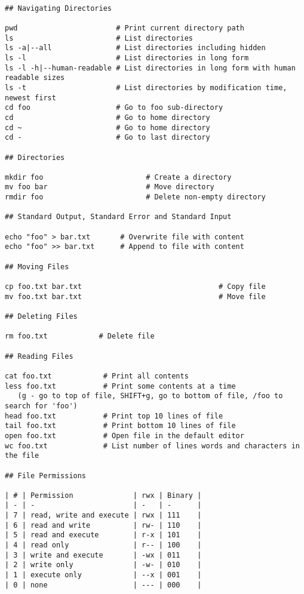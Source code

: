 \documentclass[12pt]{article}
\begin{document}
\begin{verbatim}

## Navigating Directories

pwd                       # Print current directory path
ls                        # List directories
ls -a|--all               # List directories including hidden
ls -l                     # List directories in long form
ls -l -h|--human-readable # List directories in long form with human readable sizes
ls -t                     # List directories by modification time, newest first
cd foo                    # Go to foo sub-directory
cd                        # Go to home directory
cd ~                      # Go to home directory
cd -                      # Go to last directory

## Directories

mkdir foo                        # Create a directory
mv foo bar                       # Move directory
rmdir foo                        # Delete non-empty directory

## Standard Output, Standard Error and Standard Input

echo "foo" > bar.txt       # Overwrite file with content
echo "foo" >> bar.txt      # Append to file with content

## Moving Files

cp foo.txt bar.txt                                # Copy file
mv foo.txt bar.txt                                # Move file

## Deleting Files

rm foo.txt            # Delete file

## Reading Files

cat foo.txt            # Print all contents
less foo.txt           # Print some contents at a time 
   (g - go to top of file, SHIFT+g, go to bottom of file, /foo to search for 'foo')
head foo.txt           # Print top 10 lines of file
tail foo.txt           # Print bottom 10 lines of file
open foo.txt           # Open file in the default editor
wc foo.txt             # List number of lines words and characters in the file

## File Permissions

| # | Permission              | rwx | Binary |
| - | -                       | -   | -      |
| 7 | read, write and execute | rwx | 111    |
| 6 | read and write          | rw- | 110    |
| 5 | read and execute        | r-x | 101    |
| 4 | read only               | r-- | 100    |
| 3 | write and execute       | -wx | 011    |
| 2 | write only              | -w- | 010    |
| 1 | execute only            | --x | 001    |
| 0 | none                    | --- | 000    |


\end{verbatim}
\end{document}
